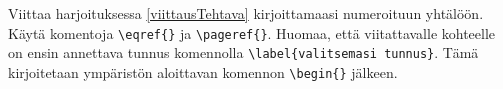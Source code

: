     \begin{harj}
        Viittaa harjoituksessa \ref{viittausTehtava} kirjoittamaasi numeroituun yhtälöön. Käytä komentoja \lstinline-\eqref{}- ja \lstinline-\pageref{}-.
        \vaihto
        Huomaa, että viitattavalle kohteelle on ensin annettava tunnus komennolla \lstinline-\label{valitsemasi tunnus}-. Tämä kirjoitetaan ympäristön aloittavan komennon \lstinline-\begin{}- jälkeen. 
    \end{harj}
